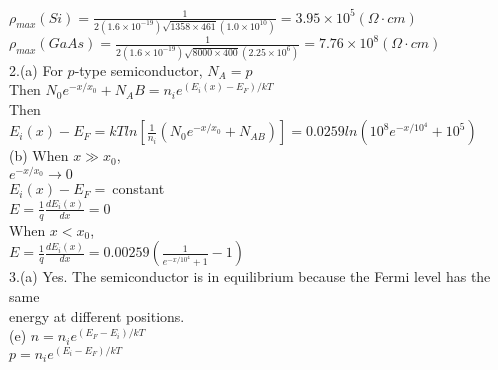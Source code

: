 \documentclass[11pt,oneside,a4paper]{article}
\begin{document}
\hspace{8.5mm} \(\rho_{max}(Si)=\frac{1}{2(1.6\times10^{-19})\sqrt{1358\times461}(1.0\times10^{10})}=3.95\times10^5 (\Omega\cdot cm)\) \\

\hspace{8.5mm} \(\rho_{max}(GaAs)=\frac{1}{2(1.6\times10^{-19})\sqrt{8000\times400}(2.25\times10^6)}=7.76\times10^8 (\Omega\cdot cm)\) \\

2.\:(a) For \(p\)-type semiconductor, \(N_A=p\) \\

\hspace{8.5mm} Then \(N_0e^{-x/x_0}+N_AB=n_ie^{(E_i(x)-E_F)/kT}\) \\

\hspace{8.5mm} Then \(E_i(x)-E_F=kTln[\frac{1}{n_i}(N_0e^{-x/x_0}+N_{AB})]=0.0259ln(10^8e^{-x/10^4}+10^5)\) \\

\quad (b) When \(x\gg x_0\), \\

\hspace{8.5mm} \(e^{-x/x_0}\rightarrow0\) \\

\hspace{8.5mm} \(E_i(x)-E_F=\ \)constant \\

\hspace{8.5mm} \(E=\frac{1}{q}\frac{dE_i(x)}{dx}=0\) \\

\hspace{8.5mm} When \(x<x_0\), \\

\hspace{8.5mm} \(E=\frac{1}{q}\frac{dE_i(x)}{dx}=0.00259(\frac{1}{e^{-x/10^4}+1}-1)\) \\

3.\:(a) Yes. The semiconductor is in equilibrium because the Fermi level has the same \\

energy at different positions. \\

\quad (e) \(n=n_ie^{(E_F-E_i)/kT}\) \\

\hspace{8.5mm} \(p=n_ie^{(E_i-E_F)/kT}\) \\
\end{document}
